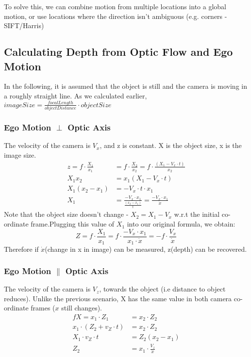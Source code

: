 To solve this, we can combine motion from multiple locations into a global motion, or use locations where the direction isn't ambiguous (e.g. corners - SIFT/Harris)

\subsection{Calculating Depth from Optic Flow and Ego Motion}
In the following, it is assumed that the object is still and the camera is moving in a roughly straight line. As we calculated earlier, $imageSize = \frac{focalLength}{objectDistance}\cdot objectSize$

\subsubsection{Ego Motion $\perp$ Optic Axis}
The velocity of the camera is $V_x$, and z is constant. X is the object size, x is the image size.
\begin{align*}
    z = f\cdot \frac{X_1}{x_1} &= f\cdot \frac{X_2}{x_2} = f\cdot \frac{(X_1 - V_x\cdot t)}{x_2} \\
                 X_1x_2 &= x_1(X_1 - V_x\cdot t) \\
                 X_1(x_2-x_1) &= -V_x\cdot t\cdot x_1\\
                 X_1 &= \frac{-V_x\cdot x_1}{\frac{(x_2-x_1)}{t}} = \frac{-V_x\cdot x_1}{\dot{x}}
\end{align*}
Note that the object size doesn't change -  $X_2 = X_1 - V_x$ w.r.t the initial co-ordinate frame.Plugging this value of $X_1$ into our original formula, we obtain:
\begin{equation}
    Z = f\cdot\frac{X_1}{x_1} = f\cdot \frac{-V_x\cdot x_1}{x_1\cdot\dot{x}} = -f \cdot \frac{V_x}{\dot{x}}
\end{equation}
Therefore if $\dot{x}$(change in x in image) can be measured, z(depth) can be recovered.

\subsubsection{Ego Motion $\|$ Optic Axis}
The velocity of the camera is $V_z$, towards the object (i.e distance to object reduces). Unlike the previous scenario, X has the same value in both camera co-ordinate frames ($x$ still changes).
\begin{align}
    fX = x_1\cdot Z_1 &= x_2\cdot Z_2 \nonumber\\
                 x_1\cdot (Z_2 + v_Z\cdot t) &= x_2\cdot Z_2 \nonumber\\
                 X_1\cdot v_Z\cdot t &= Z_2 (x_2-x_1)\nonumber\\
                 Z_2 &=  x_1\cdot \frac{V_z}{\dot{x}}
\end{align}

